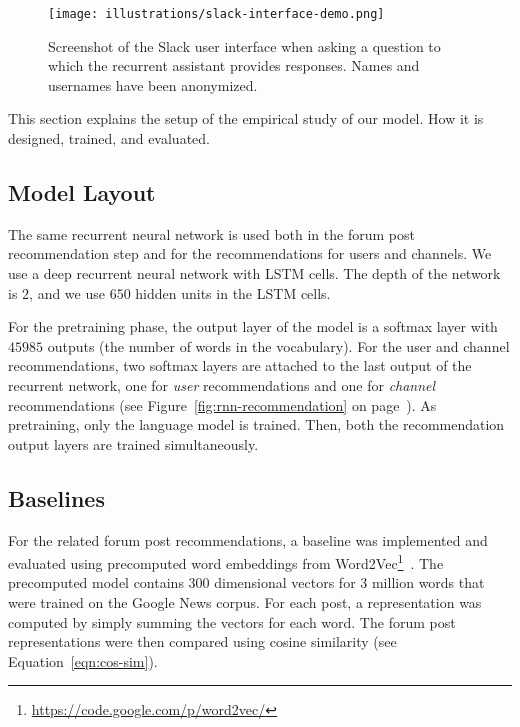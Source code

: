 \documentclass[11pt]{article}
\begin{document}
\begin{figure}[t]
  \texttt{[image: illustrations/slack-interface-demo.png]}
  \caption{Screenshot of the Slack user interface when asking a question to which the recurrent assistant provides responses. Names and usernames have been anonymized.
}
  \label{fig:slack-interface-demo}
\end{figure}


This section explains the setup of the empirical study of our model. How it is designed, trained, and evaluated. 

\subsection{Model Layout}

The same recurrent neural network is used both in the forum post recommendation step and for the recommendations for users and channels.
We use a deep recurrent neural network with LSTM cells. The depth of the network is $2$, and we use $650$ hidden units in the LSTM cells.

For the pretraining phase, the output layer of the model is a softmax layer with $45985$ outputs (the number of words in the vocabulary).
For the user and channel recommendations, two softmax layers are attached to the last output of the recurrent network, one for \textit{user} recommendations and one for \textit{channel} recommendations (see Figure~\ref{fig:rnn-recommendation} on page~\pageref{fig:rnn-recommendation}).
As pretraining, only the language model is trained. Then, both the recommendation output layers are trained simultaneously.


\subsection{Baselines}
\label{sec:baselines}

For the related forum post recommendations, a baseline was implemented and evaluated using precomputed word embeddings from Word2Vec\footnote{\url{https://code.google.com/p/word2vec/}}~\cite{mikolov2013efficient}.
The precomputed model contains $300$ dimensional vectors for $3$ million words that were trained on the Google News corpus. For each post, a representation was computed by simply summing the vectors for each word.
The forum post representations were then compared using cosine similarity (see Equation~\ref{eqn:cos-sim}).
\end{document}
